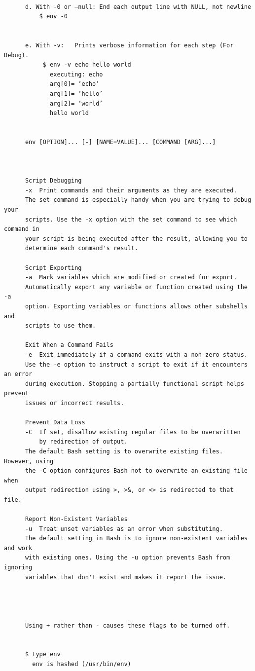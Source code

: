 \documentclass[a4paper,12pt]{article}
\begin{document}
\begin{verbatim}
      
      d. With -0 or –null: End each output line with NULL, not newline
          $ env -0
      
      
      e. With -v:	Prints verbose information for each step (For Debug).
           $ env -v echo hello world
             executing: echo
             arg[0]= ‘echo’
             arg[1]= ‘hello’
             arg[2]= ‘world’
             hello world

      
      env [OPTION]... [-] [NAME=VALUE]... [COMMAND [ARG]...]
      

      
      Script Debugging
      -x  Print commands and their arguments as they are executed.
      The set command is especially handy when you are trying to debug your             
      scripts. Use the -x option with the set command to see which command in 
      your script is being executed after the result, allowing you to 
      determine each command's result.

      Script Exporting
      -a  Mark variables which are modified or created for export.
      Automatically export any variable or function created using the -a 
      option. Exporting variables or functions allows other subshells and 
      scripts to use them.

      Exit When a Command Fails
      -e  Exit immediately if a command exits with a non-zero status.
      Use the -e option to instruct a script to exit if it encounters an error       
      during execution. Stopping a partially functional script helps prevent 
      issues or incorrect results.

      Prevent Data Loss
      -C  If set, disallow existing regular files to be overwritten
          by redirection of output.
      The default Bash setting is to overwrite existing files. However, using 
      the -C option configures Bash not to overwrite an existing file when 
      output redirection using >, >&, or <> is redirected to that file.

      Report Non-Existent Variables
      -u  Treat unset variables as an error when substituting.
      The default setting in Bash is to ignore non-existent variables and work 
      with existing ones. Using the -u option prevents Bash from ignoring 
      variables that don't exist and makes it report the issue.




      Using + rather than - causes these flags to be turned off.


      $ type env
        env is hashed (/usr/bin/env)



\end{verbatim}
\end{document}
